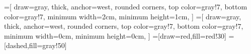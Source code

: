 \documentclass[usenames,dvipsnames, 18pt, compress, aspectratio=169]{beamer}
\begin{document}
\fontsize{14pt}{16}\selectfont
\begin{frame}
    \frametitle{}
    \begin{center}
    =[
        draw=gray,
        thick,
        anchor=west,
        rounded corners,
        top color=gray!7,
        bottom color=gray!7,
        minimum width=2cm,
        minimum height=1cm,
    ]
    =[
        draw=gray,
        thick,
        anchor=west,
        rounded corners,
        top color=gray!7,
        bottom color=gray!7,
        minimum width=0cm,
        minimum height=0cm,
    ]
    =[draw=red,fill=red!30]
    =[dashed,fill=gray!50]

    \end{center}
\end{frame}
\end{document}
